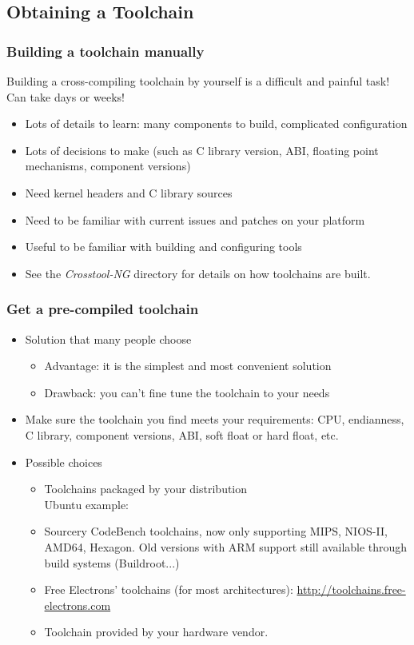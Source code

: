 \subsection{Obtaining a Toolchain}

\begin{frame}
  \frametitle{Building a toolchain manually}

  Building a cross-compiling toolchain by yourself is a difficult and painful
  task! Can take days or weeks!
  \begin{itemize}
  \item Lots of details to learn: many components to build, complicated
    configuration
  \item Lots of decisions to make (such as C library version, ABI, floating point
    mechanisms, component versions)
  \item Need kernel headers and C library sources
  \item Need to be familiar with current  issues and patches
    on your platform
  \item Useful to be familiar with building and configuring tools
  \item See the {\em Crosstool-NG}  directory for details
    on how toolchains are built.
\end{itemize}
\end{frame}

\begin{frame}
  \frametitle{Get a pre-compiled toolchain}
  \begin{itemize}
  \item Solution that many people choose
    \begin{itemize}
    \item Advantage: it is the simplest and most convenient solution
    \item Drawback: you can't fine tune the toolchain to your needs
    \end{itemize}
  \item Make sure the toolchain you find meets your requirements:
    CPU, endianness, C library, component versions, ABI, soft float
    or hard float, etc.
  \item Possible choices
    \begin{itemize}
    \item Toolchains packaged by your distribution\\
	  Ubuntu example:\\
    \item Sourcery CodeBench toolchains, now only supporting MIPS,
	  NIOS-II, AMD64, Hexagon. Old versions with ARM support still
	  available through build systems (Buildroot...)
    \item Free Electrons' toolchains (for most architectures):
          \url{http://toolchains.free-electrons.com} 
    \item Toolchain provided by your hardware vendor.
    \end{itemize}
  \end{itemize}
\end{frame}

